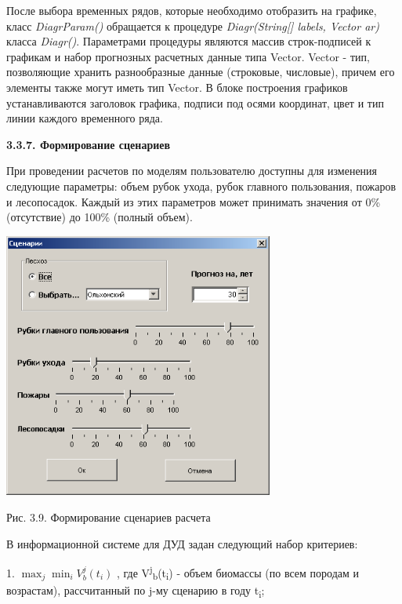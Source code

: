 \documentclass{article}
\begin{document}
После выбора временных рядов, которые необходимо 
отобразить на графике, класс \textit{DiagrParam()} обращается 
к процедуре \textit{Diagr(String[] labels, Vector ar)} класса \textit{Diagr()}. 
Параметрами процедуры являются массив строк-подписей 
к графикам и набор прогнозных расчетных данные 
типа Vector. Vector - тип, позволяющие хранить разнообразные 
данные (строковые, числовые), причем его элементы 
также могут иметь тип Vector. В блоке построения 
графиков устанавливаются заголовок графика, 
подписи под осями координат, цвет и тип линии 
каждого временного ряда.\label{HToc199746734}

\textbf{3.3.7. Формирование сценариев}

При проведении расчетов по моделям пользователю 
доступны для изменения следующие параметры: 
объем рубок ухода, рубок главного пользования, 
пожаров и лесопосадок. Каждый из этих параметров 
может принимать значения от 0\% (отсутствие) 
до 100\% (полный объем).

\begin{center}
\includegraphics[width=252pt, height=248pt, keepaspectratio=true]{asyaDisser9_3-fig006.png}

Рис. 3.9. Формирование сценариев расчета
\end{center}

В информационной системе для ДУД задан следующий 
набор критериев:

1. $\max  _{j} \min  _{i} V_{b}^{j} (t_{i} ) $ , где V\textsuperscript{j}\textsubscript{b}(t\textsubscript{i}) 
- объем биомассы (по всем породам и возрастам), 
рассчитанный по j-му сценарию в году t\textsubscript{i};
\end{document}
